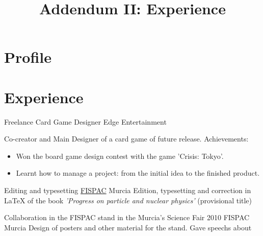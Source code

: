 \documentclass[11pt,a4paper,roman]{moderncv}
\title{Addendum II: Experience}
\begin{document}
\maketitle


\section{Profile}


\section{Experience}

	{Freelance Card Game Designer}
	{Edge Entertainment}
	{}
	{}
	{Co-creator and Main Designer of a card game of future release.\newline{}
Achievements:
\begin{itemize}
	\item Won the board game design contest with the game 'Crisis: Tokyo'.
	\item Learnt how to manage a project: from the initial idea to the finished product.
\end{itemize}}

	{Editing and typesetting}
	{\href{http://www.um.es/fispac/}{FISPAC}}
	{Murcia}
	{}
	{Edition, typesetting and correction in \LaTeX{} of the book \textit{'Progress on particle and nuclear physics'} (provisional title)\newline{}}

	{Collaboration in the FISPAC stand in the Murcia's Science Fair 2010}
	{FISPAC}
	{Murcia}
	{}
	{Design of posters and other material for the stand. Gave speechs about}
\end{document}
